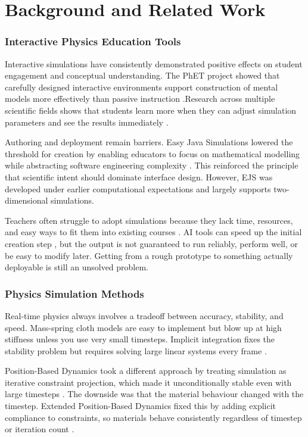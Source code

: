 \documentclass[9pt,openany]{extbook}
\begin{document}
\chapter{Background and Related Work}
\label{sec:background}

\subsection{Interactive Physics Education Tools}

Interactive simulations have consistently demonstrated positive effects on student engagement and conceptual understanding. The PhET project showed that carefully designed interactive environments support construction of mental models more effectively than passive instruction \cite{wieman2008phet}.Research across multiple scientific fields shows that students learn more when they can adjust simulation parameters and see the results immediately \cite{rutten2012learning}.

Authoring and deployment remain barriers. Easy Java Simulations lowered the threshold for creation by enabling educators to focus on mathematical modelling while abstracting software engineering complexity \cite{esquembre2004ejs}. This reinforced the principle that scientific intent should dominate interface design. However, EJS was developed under earlier computational expectations and largely supports two-dimensional simulations.

Teachers often struggle to adopt simulations because they lack time, resources, and easy ways to fit them into existing courses \cite{an2016games, kaimara2021dgbla}. AI tools can speed up the initial creation step \cite{benzion2025ai}, but the output is not guaranteed to run reliably, perform well, or be easy to modify later. Getting from a rough prototype to something actually deployable is still an unsolved problem.

\subsection{Physics Simulation Methods}

Real-time physics always involves a tradeoff between accuracy, stability, and speed. Mass-spring cloth models are easy to implement but blow up at high stiffness unless you use very small timesteps. Implicit integration fixes the stability problem but requires solving large linear systems every frame \cite{baraff_witkin1998}.

Position-Based Dynamics took a different approach by treating simulation as iterative constraint projection, which made it unconditionally stable even with large timesteps \cite{muller2007pbd}. The downside was that the material behaviour changed with the timestep. Extended Position-Based Dynamics fixed this by adding explicit compliance to constraints, so materials behave consistently regardless of timestep or iteration count \cite{macklin2016xpbd}.
\end{document}
